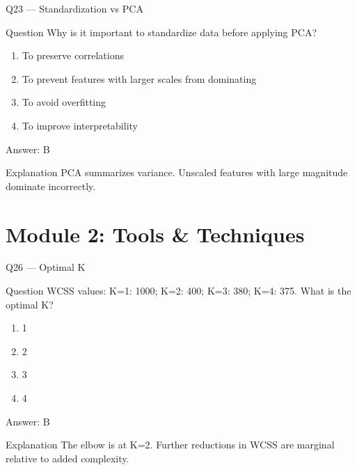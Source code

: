 \documentclass[aspectratio=169,8pt]{beamer}
\begin{document}
	\begin{frame}{Q23 --- Standardization vs PCA}
		\begin{block}{Question}
			Why is it important to standardize data before applying PCA?
		\end{block}
		\begin{enumerate}
			\item To preserve correlations
			\item To prevent features with larger scales from dominating
			\item To avoid overfitting
			\item To improve interpretability
		\end{enumerate}
		\begin{exampleblock}{Answer: B}\end{exampleblock}
		\begin{block}{Explanation}
			PCA summarizes variance. Unscaled features with large magnitude dominate incorrectly.
		\end{block}
	\end{frame}

	

	\section{Module 2: Tools \& Techniques}
	
	\begin{frame}{Q26 --- Optimal K}
		\begin{block}{Question}
			WCSS values: K=1: 1000; K=2: 400; K=3: 380; K=4: 375. What is the optimal K?
		\end{block}
		\begin{enumerate}
			\item 1
			\item 2
			\item 3
			\item 4
		\end{enumerate}
		\begin{exampleblock}{Answer: B}\end{exampleblock}
		\begin{block}{Explanation}
			The elbow is at K=2. Further reductions in WCSS are marginal relative to added complexity.
		\end{block}
	\end{frame}
	
\end{document}
